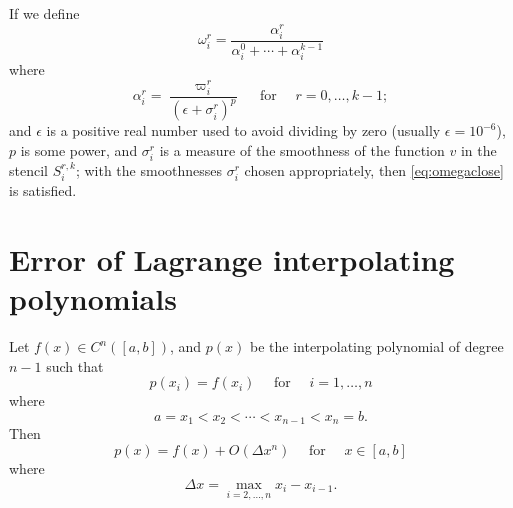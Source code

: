 \documentclass{article}
\newcommand{\for}[0]{\quad \text{ for } \quad}
\newcommand{\xlj}[0]{x_{j-1/2}}
\newcommand{\xrj}[0]{x_{j+1/2}}
\numberwithin{equation}{section}
\begin{document}
If we define
\begin{equation}
  \label{eq:omega}
  \omega_i^r = \frac{\alpha_i^r}{\alpha_i^0 + \cdots + \alpha_i^{k-1}}
\end{equation}
where
\begin{equation}
  \label{eq:alpha}
  \alpha_i^r = \frac{\varpi_i^r}{(\epsilon + \sigma_i^r)^p} \for r = 0, \ldots, k-1;
\end{equation}
and $\epsilon$ is a positive real number used to avoid dividing by
zero (usually $\epsilon = 10^{-6}$), $p$ is some power, and
$\sigma_i^r$ is a measure of the smoothness of the function $v$ in the
stencil $S^{r,k}_i$; with the smoothnesses $\sigma_i^r$ chosen
appropriately, then \eqref{eq:omegaclose} is satisfied.






\newpage
\appendix
\section{Error of Lagrange interpolating polynomials}
\label{app:lagrange}

Let $f(x) \in C^{n}([a,b])$, and $p(x)$ be the interpolating
polynomial of degree $n-1$ such that
\begin{equation}
  p(x_i) = f(x_i) \for i=1,\ldots,n
\end{equation}
where
\begin{equation}
  a = x_1 < x_2 < \cdots < x_{n-1} < x_n = b.
\end{equation}
Then
\begin{equation}
  p(x) = f(x) + O(\Delta x^n) \for x \in [a,b]
\end{equation}
where
\begin{equation}
  \Delta x = \max_{i=2,\ldots,n} x_i - x_{i-1}.
\end{equation}
\end{document}
